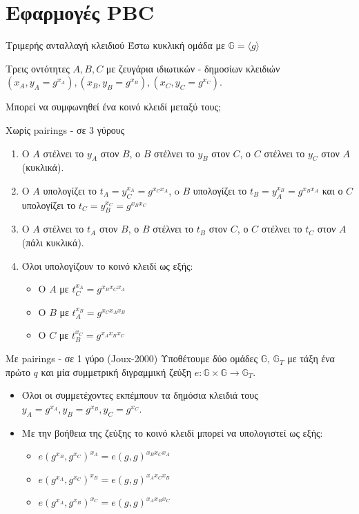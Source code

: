 \documentclass[handout]{beamer}
\begin{document}
\section{Εφαρμογές PBC}
\begin{frame}{Τριμερής ανταλλαγή κλειδιού}
	Έστω κυκλική ομάδα με $\mathbb{G}=\langle g \rangle$ \pause
	
	Τρεις οντότητες $A,B,C$ με ζευγάρια ιδιωτικών - δημοσίων κλειδιών $(x_A, y_A=g^{x_A}),(x_B, y_B=g^{x_B}),(x_C, y_C=g^{x_C})$. \pause
	
	Μπορεί να συμφωνηθεί ένα κοινό κλειδί μεταξύ τους;
\end{frame}

\begin{frame}{Χωρίς pairings - σε 3 γύρους}
	\begin{enumerate}
		\item Ο $A$ στέλνει το $y_A$ στον $B$, ο $B$ στέλνει το $y_B$ στον $C$, ο $C$ στέλνει το $y_C$ στον $A$ (κυκλικά). \pause
		\item Ο $A$ υπολογίζει το $t_A = y_C^{x_A} = g^{x_Cx_A}$, o $B$ υπολογίζει το $t_B = y_A^{x_B} = g^{x_Bx_A}$ και ο $C$ υπολογίζει το $t_C = y_B^{x_C} = g^{x_Bx_C}$ \pause
		\item Ο $A$ στέλνει το $t_A$ στον $B$, ο $B$ στέλνει το $t_B$ στον $C$, ο $C$ στέλνει το $t_C$ στον $A$ (πάλι κυκλικά). \pause
		\item Όλοι υπολογίζουν το κοινό κλειδί ως εξής:
		\begin{itemize}
			\item Ο $A$ με $t_C ^ {x_A} = g^{x_Bx_Cx_A}$ \pause
			\item Ο $B$ με $t_A ^ {x_B} = g^{x_Cx_Ax_B}$ \pause
			\item Ο $C$ με $t_B ^ {x_C} = g^{x_Ax_Bx_C}$ \pause
		\end{itemize}
		\end{enumerate}
\end{frame}

\begin{frame}{Με pairings - σε 1 γύρο (Joux-2000)} 
Υποθέτουμε δύο ομάδες  $\mathbb{G}$, $\mathbb{G}_Τ$ με τάξη ένα πρώτο $q$ και μία συμμετρική διγραμμική ζεύξη $e : \mathbb{G} \times \mathbb{G} \rightarrow \mathbb{G}_T$.  \pause
\begin{itemize}
\item Όλοι οι συμμετέχοντες εκπέμπουν τα δημόσια κλειδιά τους $y_A=g^{x_A},y_B=g^{x_B},y_C=g^{x_C}$. \pause
\item Με την βοήθεια της ζεύξης το κοινό κλειδί μπορεί να υπολογιστεί ως εξής: 
\begin{itemize}
\item $e(g^{x_B},g^{x_C})^{x_A} = e(g,g)^{x_Bx_Cx_A}$ \pause
\item $e(g^{x_A},g^{x_C})^{x_B} = e(g,g)^{x_Ax_Cx_B}$ \pause
\item $e(g^{x_A},g^{x_B})^{x_C} = e(g,g)^{x_Ax_Bx_C}$
\end{itemize}
\end{itemize}
\end{frame}
\end{document}

